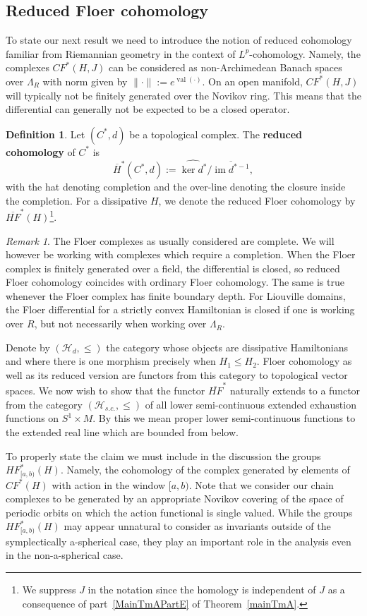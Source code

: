 \documentclass[11pt]{amsart}
\DeclareMathOperator{\val}{val}
\DeclareMathOperator{\im}{im}
\theoremstyle{definition}
\newtheorem{df}[tm]{Definition}
\theoremstyle{remark}
\newtheorem{rem}[tm]{Remark}
\begin{document}
\subsection{Reduced Floer cohomology}\label{subsecRedFlCo}
To state our next result we need to introduce the notion of reduced cohomology familiar from Riemannian geometry in the context of  $L^p$-cohomology. Namely, the complexes $CF^*(H,J)$ can be considered as non-Archimedean Banach spaces over $\Lambda_R$ with norm given by $\|\cdot\|:=e^{\val(\cdot)}$. On an open manifold, $CF^*(H,J)$ will typically not be finitely generated over the Novikov ring. This means that the differential can generally not be expected to be a closed operator.
\begin{df}
Let $(C^*,d)$ be a topological complex. The \textbf{reduced cohomology} of $C^*$ is
\[
\overline{H}^*(C^*,d):=\widehat{\ker {d^{*}}}/\overline{\im d^{*-1}},
\]
with the hat denoting completion and the over-line denoting the closure inside the completion. For a dissipative $H$, we denote the reduced Floer cohomology by $\overline{HF}^*(H)$\footnote{We suppress $J$ in the notation since the homology is independent of $J$ as a consequence of part~\ref{MainTmAPartE} of Theorem~\ref{mainTmA}.}.
\end{df}
\begin{rem}
The Floer complexes as usually considered are complete. We will however be working with complexes which require a completion. When the Floer complex is finitely generated over a field, the differential is closed, so reduced Floer cohomology coincides with ordinary Floer cohomology. The same is true whenever the Floer complex has finite boundary depth. For Liouville domains, the Floer differential for a strictly convex Hamiltonian is closed if one is working over $R$, but not necessarily when working over $\Lambda_R$.
\end{rem}
Denote by $(\mathcal{H}_d,\leq)$ the category whose objects are dissipative Hamiltonians and where there is one morphism precisely when $H_1\leq H_2$. Floer cohomology as well as its reduced version are functors from this category to topological vector spaces. We now wish to show that the functor $\overline{HF}^*$ naturally extends to a functor from the category $(\mathcal{H}_{s.c.},\leq)$ of all lower semi-continuous extended exhaustion functions on $S^1\times M$. By this we mean proper lower semi-continuous functions to the extended real line which are bounded from below.

To properly state the claim we must include in the discussion the groups $HF^*_{[a,b)}(H)$. Namely, the cohomology of the complex generated by elements of $CF^*(H)$ with action in the window $[a,b)$. Note that we consider our chain complexes to be generated by an appropriate Novikov covering of the space of periodic orbits on which the action functional is single valued. While the groups $HF^*_{[a,b)}(H)$ may appear unnatural to consider as invariants outside of the symplectically a-spherical case, they play an important role in the analysis even in the non-a-spherical case.
\end{document}
